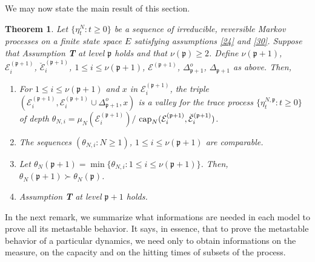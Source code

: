 \documentclass[reqno]{amsart}
\newtheorem{theorem}{Theorem}[section]
\begin{document}
We may now state the main result of this section. 

\begin{theorem}
\label{s37}
Let $\{\eta^N_t : t\ge 0\}$ be a sequence of irreducible, reversible
Markov processes on a finite state space $E$ satisfying assumptions
\eqref{24} and \eqref{30}. Suppose that Assumption {\bf T} at level
${{\mathfrak p}}$ holds and that $\nu({{\mathfrak p}})\ge 2$. Define $\nu({{\mathfrak p}}+1)$, ${{\mathcal E}}^{({{\mathfrak p}}+1)}_i$, $\breve{{{\mathcal E}}}^{({{\mathfrak p}}+1)}_i$, $1\le i\le \nu({{\mathfrak p}}+1)$, ${{\mathcal E}}^{({{\mathfrak p}}+1)}$, $\Delta^o_{{{\mathfrak p}} +1}$, $\Delta_{{{\mathfrak p}}+1}$
as above. Then,
\begin{enumerate}
\item For $1\le i\le \nu ({{\mathfrak p}}+1)$ and $x$ in ${{\mathcal E}}^{({{\mathfrak p}} +1)}_i$,
  the triple $({{\mathcal E}}^{({{\mathfrak p}} +1)}_i, {{\mathcal E}}^{({{\mathfrak p}} +1)}_i \cup
  \Delta^o_{{{\mathfrak p}}+1} ,x)$ is a valley for the trace process
  $\{\eta^{N,{{\mathfrak p}}}_t : t\ge 0\}$ of depth $\theta_{N,i} = \mu_N({{\mathcal E}}^{({{\mathfrak p}} +1)}_i)/$ ${{\rm cap}}_N ({{\mathcal E}}^{({{\mathfrak p}} +1)}_i , \breve{{{\mathcal E}}}^{({{\mathfrak p}} +1)}_i)$.

\item The sequences $(\theta_{N,i} : N\ge 1)$, $1\le i\le \nu({{\mathfrak p}}+1)$ are comparable.

\item Let $\theta_N({{\mathfrak p}}+1) = \min\{\theta_{N,i} : 1\le i\le \nu ({{\mathfrak p}}+1)\}$. Then, $\theta_N({{\mathfrak p}}+1) \succ \theta_N({{\mathfrak p}})$.

\item Assumption {\bf T} at level ${{\mathfrak p}}+1$ holds.
\end{enumerate}
\end{theorem}

In the next remark, we summarize what informations are needed in each
model to prove all its metastable behavior. It says, in essence, that
to prove the metastable behavior of a particular dynamics, we need
only to obtain informations on the measure, on the capacity and on the
hitting times of subsets of the process.
\end{document}
